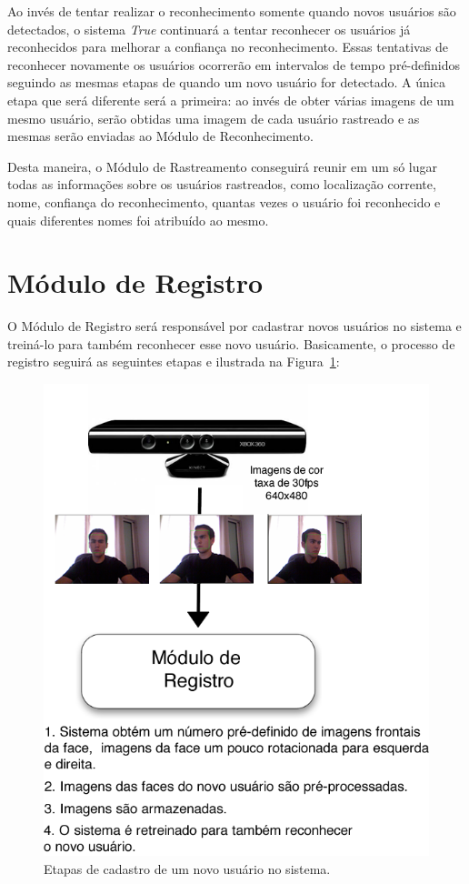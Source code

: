 	Ao invés de tentar realizar o reconhecimento somente quando novos usuários são detectados, o sistema \textit{True} continuará a tentar reconhecer os usuários já reconhecidos para melhorar a confiança no reconhecimento. Essas tentativas de reconhecer novamente os usuários ocorrerão em intervalos de tempo pré-definidos seguindo as mesmas etapas de quando um novo usuário for detectado. A única etapa que será diferente será a primeira: ao invés de obter várias imagens de um mesmo usuário, serão obtidas uma imagem de cada usuário rastreado e as mesmas serão enviadas ao Módulo de Reconhecimento.

	Desta maneira, o Módulo de Rastreamento conseguirá reunir em um só lugar todas as informações sobre os usuários rastreados, como localização corrente, nome, confiança do reconhecimento, quantas vezes o usuário foi reconhecido e quais diferentes nomes foi atribuído ao mesmo.


\section{Módulo de Registro}

	O Módulo de Registro será responsável por cadastrar novos usuários no sistema e treiná-lo para também reconhecer esse novo usuário. Basicamente, o processo de registro seguirá as seguintes etapas e ilustrada na Figura~\ref{fig:registro}:

		\begin{figure}[hbt]
			\begin{center}
				\includegraphics[scale=2.5]{figuras/4.ProblemaEProposta/registro.png}
			\end{center}
			\caption{Etapas de cadastro de um novo usuário no sistema.}
			\label{fig:registro}
		\end{figure}		

